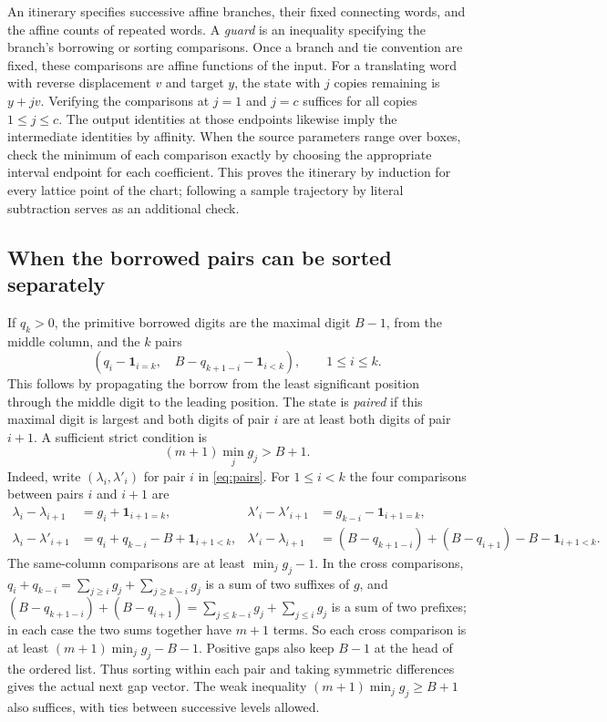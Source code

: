 \documentclass[11pt,reqno]{amsart}
\theoremstyle{remark}
\begin{document}
An itinerary specifies successive affine branches, their fixed
connecting words, and the affine counts of repeated words. A
\emph{guard} is an inequality specifying the branch's borrowing or
sorting comparisons. Once a branch and tie convention are fixed,
these comparisons are affine functions of the input. For a translating
word with reverse displacement \(v\) and target \(y\), the state with
\(j\) copies remaining is \(y+jv\). Verifying the comparisons at
\(j=1\) and \(j=c\) suffices for all copies \(1\le j\le c\).
The output identities at those endpoints likewise imply the
intermediate identities by affinity. When the source parameters
range over boxes, check the minimum of each comparison exactly by
choosing the appropriate interval endpoint for each coefficient.
This proves the itinerary by induction for every lattice point of
the chart; following a sample trajectory by literal subtraction serves
as an additional check.

\subsection{When the borrowed pairs can be sorted separately}

If \(q_k>0\), the primitive borrowed digits are the maximal
digit \(B-1\), from the middle column, and the \(k\) pairs
\begin{equation}\label{eq:pairs}
  \left(q_i-\mathbf1_{i=k},\quad
               B-q_{k+1-i}-\mathbf1_{i<k}\right),\qquad 1\le i\le k .
\end{equation}
This follows by propagating the borrow from the least significant
position through the middle digit to the leading position. The state is
\emph{paired} if this maximal digit is largest and both digits of pair
\(i\) are at least both digits of pair \(i+1\).
A sufficient strict condition is
\begin{equation}\label{eq:physical}
                     (m+1)\min_j g_j>B+1.
\end{equation}
Indeed, write \((\lambda_i,\lambda'_i)\) for pair \(i\) in \eqref{eq:pairs}.
For \(1\le i<k\) the four comparisons between pairs \(i\) and \(i+1\) are
\[
\begin{aligned}
 \lambda_i-\lambda_{i+1}&=g_i+\mathbf1_{i+1=k}, &
 \lambda'_i-\lambda'_{i+1}&=g_{k-i}-\mathbf1_{i+1=k},\\
 \lambda_i-\lambda'_{i+1}&=q_i+q_{k-i}-B+\mathbf1_{i+1<k}, &
 \lambda'_i-\lambda_{i+1}&=(B-q_{k+1-i})+(B-q_{i+1})-B-\mathbf1_{i+1<k}.
\end{aligned}
\]
The same-column comparisons are at least \(\min_j g_j-1\).
In the cross comparisons, \(q_i+q_{k-i}=\sum_{j\ge i}g_j+\sum_{j\ge k-i}g_j\)
is a sum of two suffixes of \(g\), and
\((B-q_{k+1-i})+(B-q_{i+1})=\sum_{j\le k-i}g_j+\sum_{j\le i}g_j\) is a sum
of two prefixes; in each case the two sums together have \(m+1\) terms.
So each cross comparison is at least \((m+1)\min_jg_j-B-1\).
Positive gaps also keep \(B-1\) at the head of the
ordered list. Thus sorting within each pair and taking symmetric
differences gives the actual next gap vector. The weak inequality
\((m+1)\min_j g_j\ge B+1\) also suffices, with ties between successive
levels allowed.
\end{document}
